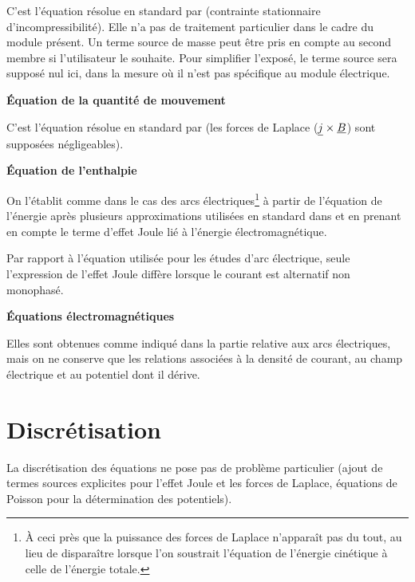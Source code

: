 C'est l'\'equation r\'esolue en standard par \CS (contrainte
stationnaire d'incompressibilit\'e). Elle n'a pas de traitement particulier dans
le cadre du module pr\'esent. Un terme source de  masse peut \^etre pris en
compte au second membre si l'utilisateur le souhaite. Pour simplifier
l'expos\'e,
le terme source sera suppos\'e nul ici, dans la mesure o\`u il n'est pas
sp\'ecifique au module \'electrique.

\vspace*{0,5cm}
{\bf \'Equation de la quantit\'e de mouvement}
\nopagebreak

C'est l'\'equation r\'esolue en standard par \CS (les forces de Laplace
($\underline{j} \times \underline{B}$) sont suppos\'ees n\'egligeables).

\vspace*{0,5cm}
{\bf \'Equation de l'enthalpie}
\nopagebreak

On l'\'etablit comme dans le cas des arcs \'electriques\footnote{\`A ceci pr\`es
que la puissance des
forces de Laplace n'appara\^it pas du tout, au lieu de dispara\^itre lorsque
l'on soustrait l'\'equation de l'\'energie cin\'etique \`a celle de l'\'energie
totale.} \`a partir de l'équation de
l'\'energie apr\`es plusieurs approximations utilis\'ees en standard dans \CS et en
prenant en compte le terme d'effet Joule li\'e \`a l'\'energie
\'electromagn\'etique.

Par rapport \`a l'\'equation utilis\'ee pour les \'etudes d'arc \'electrique,
seule l'expression de l'effet Joule diff\`ere lorsque le courant est
alternatif non monophas\'e.

\vspace*{0,5cm}
{\bf \'Equations \'electromagn\'etiques}
\nopagebreak

Elles sont obtenues comme indiqu\'e dans la partie relative aux arcs
\'electriques, mais on ne conserve que les relations associ\'ees \`a la
densit\'e de courant, au champ \'electrique et au potentiel dont il d\'erive.

\section*{Discr\'etisation}

La discr\'etisation des \'equations ne pose pas de probl\`eme particulier
(ajout de termes sources explicites pour l'effet Joule et les forces de Laplace,
\'equations de Poisson pour la d\'etermination des potentiels).

